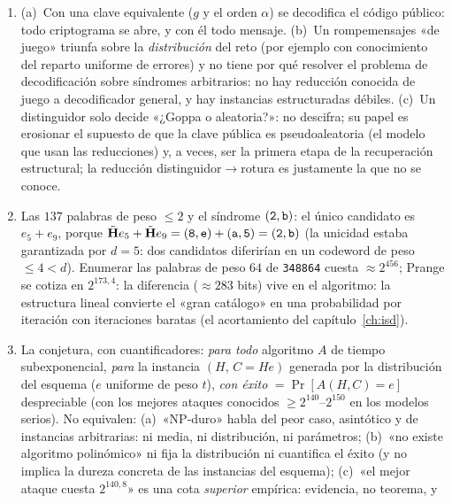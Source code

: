 \documentclass[11pt,a4paper,oneside]{report}
\newcommand{\Hmat}{\mathbf{H}}          %
\newcommand{\hx}[1]{\text{\texttt{#1}}}
\begin{document}
\begin{enumerate}[leftmargin=1.9em,itemsep=4pt]
  \item (a)~Con una clave equivalente ($g$ y el orden $\alpha$) se
        decodifica el código público: todo criptograma se abre, y
        con él todo mensaje. (b)~Un rompemensajes «de juego» triunfa
        sobre la \emph{distribución} del reto (por ejemplo con
        conocimiento del reparto uniforme de errores) y no tiene por
        qué resolver el problema de decodificación sobre síndromes
        arbitrarios: no hay reducción conocida de juego a
        decodificador general, y hay instancias estructuradas
        débiles. (c)~Un distinguidor solo decide «¿Goppa o
        aleatoria?»: no descifra; su papel es erosionar el supuesto
        de que la clave pública es pseudoaleatoria (el modelo que usan
        las reducciones) y, a veces, ser la primera etapa de la
        recuperación estructural; la reducción
        distinguidor$\to$rotura es justamente la que no se conoce.
  \item Las $137$ palabras de peso $\le2$ y el síndrome
        $(\hx2,\hx b)$: el único candidato es $e_5+e_9$, porque
        $\tilde{\Hmat}e_5+\tilde{\Hmat}e_9
        =(\hx8,\hx e)+(\hx a,\hx5)=(\hx2,\hx b)$ (la unicidad estaba
        garantizada por $d=5$: dos candidatos diferirían en un
        codeword de peso $\le4<d$). Enumerar las palabras de peso
        $64$ de \texttt{348864} cuesta $\approx2^{456}$; Prange se
        cotiza en $2^{173{,}4}$: la diferencia ($\approx283$ bits)
        vive en el algoritmo: la estructura lineal convierte el
        «gran catálogo» en una probabilidad por iteración con
        iteraciones baratas (el acortamiento del
        capítulo~\ref{ch:isd}).
  \item La conjetura, con cuantificadores: \emph{para todo}
        algoritmo $A$ de tiempo subexponencial, \emph{para} la
        instancia $(H,\,C=He)$ generada por la distribución del
        esquema ($e$ uniforme de peso $t$), \emph{con éxito}
        $=\Pr[A(H,C)=e]$ despreciable (con los mejores ataques
        conocidos $\ge2^{140}$--$2^{150}$ en los modelos serios).
        No equivalen: (a)~«NP-duro» habla del peor caso,
        asintótico y de instancias arbitrarias: ni media, ni
        distribución, ni parámetros; (b)~«no existe algoritmo
        polinómico» ni fija la distribución ni cuantifica el éxito
        (y no implica la dureza concreta de las instancias del
        esquema); (c)~«el mejor ataque cuesta $2^{140{,}8}$» es una
        cota \emph{superior} empírica: evidencia, no teorema, y

\end{enumerate}
\end{document}
